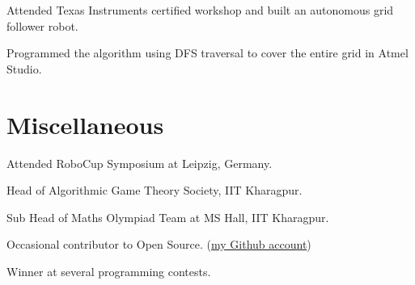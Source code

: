 \documentclass[a4paper]{deedy-resume} %
\begin{document}
\begin{minipage}[t]{0.66\textwidth}
  \sectionspace

  \runsubsection{}
  \begin{tightitemize}
  \item Attended Texas Instruments certified workshop and built an autonomous grid follower robot.
  \item Programmed the algorithm using DFS traversal to cover the entire grid in Atmel Studio.
  \end{tightitemize}

  \section{Miscellaneous}
  \vspace{\topsep}
  \begin{tightitemize}
  \item Attended RoboCup Symposium at Leipzig, Germany.
  \item Head of Algorithmic Game Theory Society, IIT Kharagpur.
  \item Sub Head of Maths Olympiad Team at MS Hall, IIT Kharagpur.
  \item Occasional contributor to Open Source.
    (\href{https://github.com/VaibhavAgarwalVA}{my Github account})
  \item Winner at several programming contests.
  \end{tightitemize}

\end{minipage}
\end{document}
